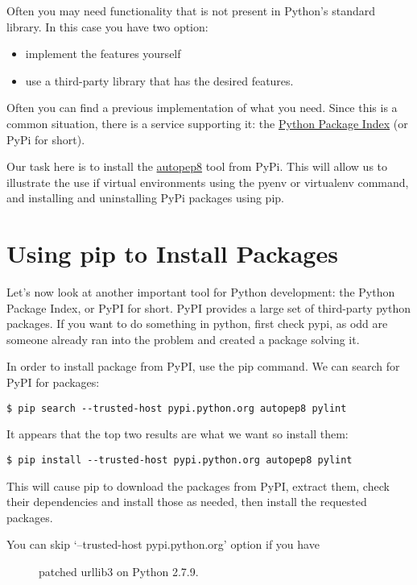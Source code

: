 Often you may need functionality that is not present in Python's
standard library. In this case you have two option:

\begin{itemize}
\tightlist
\item
  implement the features yourself
\item
  use a third-party library that has the desired features.
\end{itemize}

Often you can find a previous implementation of what you need. Since
this is a common situation, there is a service supporting it: the
\href{https://pypi.python.org/pypi}{Python Package Index} (or PyPi for
short).

Our task here is to install the \href{}{autopep8} tool from PyPi. This
will allow us to illustrate the use if virtual environments using the
pyenv or virtualenv command, and installing and uninstalling PyPi
packages using pip.

\section{Using pip to Install
Packages}\label{using-pip-to-install-packages}

Let's now look at another important tool for Python development: the
Python Package Index, or PyPI for short. PyPI provides a large set of
third-party python packages. If you want to do something in python,
first check pypi, as odd are someone already ran into the problem and
created a package solving it.

In order to install package from PyPI, use the pip command. We can
search for PyPI for packages:

\begin{verbatim}
$ pip search --trusted-host pypi.python.org autopep8 pylint
\end{verbatim}

It appears that the top two results are what we want so install them:

\begin{verbatim}
$ pip install --trusted-host pypi.python.org autopep8 pylint
\end{verbatim}

This will cause pip to download the packages from PyPI, extract them,
check their dependencies and install those as needed, then install the
requested packages.

\begin{description}
\item[You can skip `--trusted-host pypi.python.org' option if you have]
patched urllib3 on Python 2.7.9.
\end{description}

